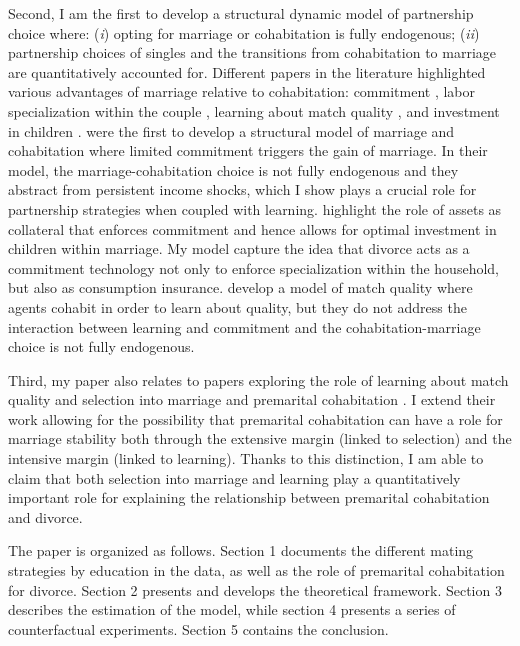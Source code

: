 \documentclass[12pt]{article}
\begin{document}
Second, I am the first to develop a structural dynamic model of partnership choice where: (\textit{i}) opting for marriage or cohabitation is fully endogenous; (\textit{ii}) partnership choices of singles and the transitions from cohabitation to marriage are quantitatively accounted for. Different papers in the literature highlighted various advantages of marriage relative to cohabitation: commitment \citep{matouschek2008,blasutto2020}, labor specialization within the couple \citep{gemici2014}, learning about match quality \citep{brien2006}, and investment in children \citep{lafortune2020}.  \citet{gemici2014} were the first to develop a structural model of marriage and cohabitation where limited commitment triggers the gain of marriage. In their model, the marriage-cohabitation choice is not fully endogenous and they abstract from persistent income shocks, which I show plays a crucial role for partnership strategies when coupled with learning. \cite{lafortune2020} highlight the role of assets as collateral that enforces commitment and hence allows for optimal investment in children within marriage. My model capture the idea that divorce acts as a commitment technology not only to enforce specialization within the household, but also as consumption insurance. \citet{brien2006} develop a model of match quality where agents cohabit in order to learn about quality, but they do not address the interaction between learning and commitment and the cohabitation-marriage choice is not fully endogenous.

Third, my paper also relates to papers exploring the role of learning about match quality \citep{marinescu2016} and selection into marriage and premarital cohabitation \citep{lillard1995,reinhold2010,svarer2004}. I extend their work allowing for the possibility that premarital cohabitation can have a role for marriage stability both through the extensive margin (linked to selection) and the intensive margin (linked to learning). Thanks to this distinction, I am able to claim that both selection into marriage and learning play a quantitatively important role for explaining the relationship between premarital cohabitation and divorce.

The paper is organized as follows. Section 1 documents the different mating strategies by education in the data, as well as the role of premarital cohabitation for divorce. Section 2 presents and develops the theoretical framework. Section 3 describes the estimation of the model, while section 4 presents a series of counterfactual experiments. Section 5 contains the conclusion.
\end{document}
